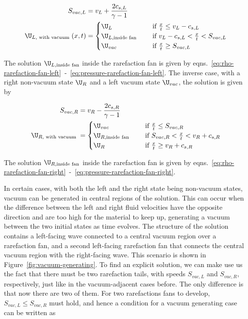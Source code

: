 \begin{align}
    S_{vac, L} &= v_L + \frac{2 c_{s,L}}{\gamma - 1} \\
    \U_{L, \text{ with vacuum }}(x,t) &=
        \begin{cases}
            \U_L & \quad \text{ if } \frac{x}{t} \leq v_L - c_{s,L} \\
            \U_{L, \text{inside fan}} & \quad \text{ if } v_L - c_{s,L} < \frac{x}{t} < S_{vac, L}
\\
            \U_{vac} & \quad \text{ if } \frac{x}{t} \geq S_{vac, L}\\
        \end{cases}
\end{align}

The solution $\U_{L, \text{inside fan}}$ inside the rarefaction fan is given by
eqns.~\ref{eq:rho-rarefaction-fan-left}~-~\ref{eq:pressure-rarefaction-fan-left}.
The inverse case, with a right non-vacuum state $\U_R$ and a left vacuum state $\U_{vac}$, the
solution is given by

\begin{align}
    S_{vac, R} &= v_R - \frac{2 c_{s,R}}{\gamma - 1} \\
    \U_{R, \text{ with vacuum }} &=
        \begin{cases}
            \U_{vac} & \quad \text{ if } \frac{x}{t} \leq S_{vac, R}\\
            \U_{R, \text{inside fan}} & \quad \text{ if } S_{vac, R} < \frac{x}{t} < v_R + c_{s,R}\\
            \U_R & \quad \text{ if } \frac{x}{t} \geq v_R + c_{s,R} \\
        \end{cases}
\end{align}

The solution $\U_{R, \text{inside fan}}$ inside the rarefaction fan is given by
eqns.~\ref{eq:rho-rarefaction-fan-right}~-~\ref{eq:pressure-rarefaction-fan-right}.





In certain cases, with both the left and the right state being non-vacuum states, vacuum
can be generated in central regions of the solution. This can occur when the difference between the
left and right fluid velocities have the opposite direction and are too high for the material to
keep up, generating a vacuum between the two initial states as time evolves. The structure of the
solution contains a left-facing wave connected to a central vacuum region over a rarefaction fan,
and a second left-facing rarefaction fan that connects the central vacuum region with the
right-facing wave. This scenario is shown in Figure~\ref{fig:vacuum-generating}.  To find an
explicit solution, we can make use us the fact that
there must be two rarefaction tails, with speeds $S_{vac,L}$ and $S_{vac,R}$, respectively, just
like in the vacuum-adjacent cases before. The only difference is that now there are two of them.
For two rarefactions fans to develop, $S_{vac, L} \leq S_{vac, R}$ must hold, and hence a condition
for a vacuum generating case can be written as

